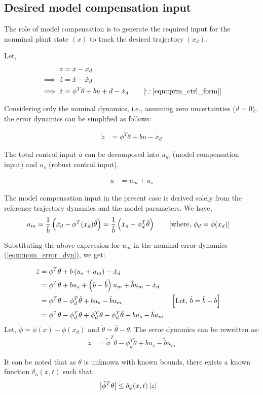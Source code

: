 \subsection{Desired model compensation input}
The role of model compensation is to generate the required input for the
nonminal plant state $(x)$ to track the desired trajectory $(x_d)$.

Let,
\begin{align}
    z &= x - x_d\\
    \implies \dot z &= \dot x - \dot x_d\\
    \implies \dot z &= \phi^T \theta +  bu + d - \dot x_d \qquad \left[ \because \ref{eqn::prm_ctrl_form} \right]
    \label{eqn::error_dyn}
\end{align}

Considering only the nominal dynamics, i.e., assuming zero uncertainties ($d = 0$), the error dynamics can be simplified as follows:

\begin{align}
    \dot z &= \phi^T \theta + bu - \dot x_d
    \label{eqn::nom_error_dyn}
\end{align}

The total control input $u$ can be decomposed into $u_m$ (model compensation input) and $u_s$ (robust control input).

\begin{align}
    u &= u_m + u_s
\end{align}

The model compensation input in the present case is derived solely from the
reference trajectory dynamics and the model parameters. We have,
\begin{align}
    u_m &= \frac{1}{\hat b} \left( \dot x_d - \phi^T(x_d) \hat \theta \right)
         = \frac{1}{\hat b} \left( \dot x_d - \phi^T_d \hat \theta \right)
         \qquad \left[ \text{where, } \phi_d  = \phi(x_d) \right]
\end{align}

Substituting the above expression for $u_m$ in the nominal error dynamics (\ref{eqn::nom_error_dyn}), we get:

\begin{align*}
    \dot z &= \phi^T \theta + b \left( u_s + u_m \right) - \dot x_d \\
    &= \phi^T \theta + bu_s + \left( b - \hat b \right) u_m  + \hat b u_m - \dot x_d \\
    &= \phi^T \theta - \phi^T_d \hat \theta + bu_s - \tilde b u_m
    &&\left[ \text{Let, } \tilde b = \hat b - b \right]\\
    &= \phi^T \theta - \phi^T_d \theta + \phi^T_d \theta - \phi^T_d \hat \theta + bu_s - \tilde b u_m\\
\end{align*}
Let, $\tilde \phi = \phi(x) - \phi(x_d)$ and $\tilde \theta = \hat \theta -
\theta$. The error dynamics can be rewritten as:
\begin{align}
    \dot z &= \tilde \phi^T \theta - \phi^T_d \tilde \theta + bu_s - \tilde b u_m \label{eqn::error_dyn_model_comp}
\end{align}

It can be noted that as $\theta$ is unknown with known bounds, there exists a
known function $\delta_\phi(x, t)$ such that:
\begin{align}
    \left\lvert \tilde \phi^T \theta \right\rvert &\leq \delta_\phi(x, t) \left\lvert z \right\rvert
\end{align}
